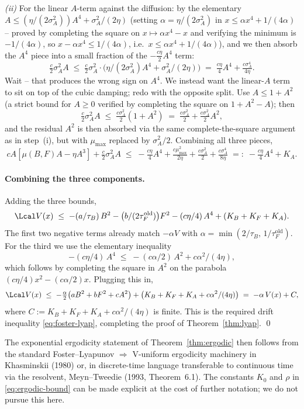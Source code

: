 \emph{(ii)} For the linear $A$-term against the diffusion: by the
elementary $A \le (\eta/(2\sigma_A^2))A^4 + \sigma_A^2/(2\eta)$
(setting $\alpha = \eta/(2\sigma_A^2)$ in
$x \le \alpha x^4 + 1/(4\alpha)$ -- proved by completing the
square on $x \mapsto \alpha x^4 - x$ and verifying the minimum is
$-1/(4\alpha)$, so $x - \alpha x^4 \le 1/(4\alpha)$, i.e.\
$x \le \alpha x^4 + 1/(4\alpha)$), and we then absorb the $A^4$
piece into a small fraction of the $-\tfrac{c\eta}{2}A^4$ term:
\[
  \tfrac{c}{2}\sigma_A^2 A
   \;\le\; \tfrac{c}{2}\sigma_A^2 \cdot
            \bigl(\eta/(2\sigma_A^2) A^4 + \sigma_A^2/(2\eta)\bigr)
   \;=\; \tfrac{c\eta}{4} A^4 + \tfrac{c\sigma_A^4}{4\eta}.
\]
Wait -- that produces the wrong sign on $A^4$. We instead want the
linear-$A$ term to sit on top of the cubic damping; redo with the
opposite split. Use $A \le 1 + A^2$ (a strict bound for $A \ge 0$
verified by completing the square on $1 + A^2 - A$); then
\[
  \tfrac{c}{2}\sigma_A^2 A
   \;\le\; \tfrac{c\sigma_A^2}{2}(1 + A^2)
   \;=\; \tfrac{c\sigma_A^2}{2} + \tfrac{c\sigma_A^2}{2}A^2,
\]
and the residual $A^2$ is then absorbed via the same complete-the-square
argument as in step~(i), but with $\mu_{\max}$ replaced by
$\sigma_A^2/2$. Combining all three pieces,
\[
  cA[\mu(B,F)A - \eta A^3] + \tfrac{c}{2}\sigma_A^2 A
   \;\le\; -\tfrac{c\eta}{4}A^4
            + \tfrac{c\mu_{\max}^2}{2\eta}
            + \tfrac{c\sigma_A^2}{2}
            + \tfrac{c\sigma_A^4}{8\eta}
   \;=:\; -\tfrac{c\eta}{4}A^4 + K_A.
\]

\paragraph{Combining the three components.} Adding the three bounds,
\begin{equation*}
  \Lcal V(x)
   \;\le\;
   -(a/\tau_B)\,B^2
   - \bigl(b/(2\tau_F^{\mathrm{old}})\bigr) F^2
   - (c\eta/4)\,A^4
   + (K_B + K_F + K_A).
\end{equation*}
The first two negative terms already match $-\alpha V$ with
$\alpha = \min(2/\tau_B,\,1/\tau_F^{\mathrm{old}})$. For the third
we use the elementary inequality
\[
  -(c\eta/4)\,A^4 \;\le\; -(c\alpha/2)\,A^2 + c\alpha^2/(4\eta),
\]
which follows by completing the square in $A^2$ on the parabola
$(c\eta/4)x^2 - (c\alpha/2)x$. Plugging this in,
\begin{equation*}
  \Lcal V(x)
   \;\le\;
   -\tfrac{\alpha}{2}\bigl(a B^2 + b F^2 + c A^2\bigr)
   + \bigl(K_B + K_F + K_A + c\alpha^2/(4\eta)\bigr)
   \;=\;
   -\alpha\,V(x) + C,
\end{equation*}
where $C := K_B + K_F + K_A + c\alpha^2/(4\eta)$ is finite. This is
the required drift inequality \eqref{eq:foster-lyap}, completing
the proof of Theorem~\ref{thm:lyap}. \qed

\medskip

The exponential ergodicity statement of Theorem~\ref{thm:ergodic}
then follows from the standard Foster--Lyapunov $\Rightarrow$ V-uniform
ergodicity machinery in Khasminskii (1980) or, in discrete-time
language transferable to continuous time via the resolvent,
Meyn--Tweedie (1993, Theorem~6.1). The constants $K_0$ and $\rho$
in \eqref{eq:ergodic-bound} can be made explicit at the cost of
further notation; we do not pursue this here.
